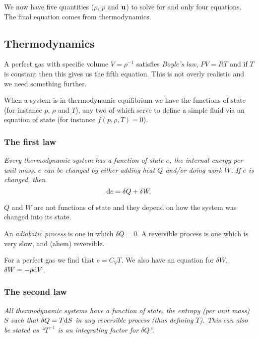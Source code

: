 \documentclass{notes}
\begin{document}
We now have five quantities ($\rho$, $p$ and $\mathbf{u}$) to solve for
and only four equations.  The final equation comes from thermodynamics.

\subsection{Thermodynamics}

A perfect gas with specific volume $V = \rho^{-1}$ satisfies
\emph{Boyle's law}, $PV = R T$ and if $T$ is constant then this gives us
the fifth equation.  This is not overly realistic and we need something
further.

When a system is in thermodynamic equilibrium we have the functions
of state (for instance $p$, $\rho$ and $T$), any two of which serve to
define a simple fluid via an equation of state (for instance
$f(p,\rho,T) = 0$).

\subsubsection*{The first law}

\begin{center}
\parbox{3in}{ \itshape
Every thermodynamic system has a function of state $e$, the internal
energy per unit mass.  $e$ can be changed by either adding heat $Q$
and/or doing work $W$.  If $e$ is changed, then
\[
\mathrm{d} e = \delta Q + \delta W.
\]
}
\end{center}

$Q$ and $W$ are not functions of state and they depend on how the system
was changed into its state.

An \emph{adiabatic process} is one in which $\delta Q = 0$.  A reversible
process is one which is very slow, and (ahem) reversible.

For a perfect gas we find that $e = C_V T$.  We also have an equation 
for $\delta W$, ${\delta W = - p \mathrm{d} V}$.

\subsubsection*{The second law}

\begin{center}
\parbox{3in}{ \itshape
All thermodynamic systems have a function of state, the entropy
(per unit mass) $S$ such that $\delta Q = T \mathrm{d} S$ in any reversible
process (thus defining $T$).  This can also be stated as
``$T^{-1}$ is an integrating factor for $\delta Q$''.
}
\end{center}
\end{document}
